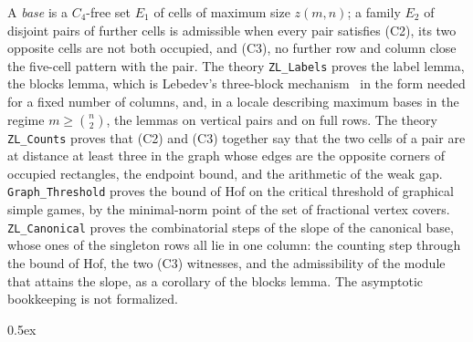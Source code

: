 \documentclass[10pt,a4paper]{article}
\begin{document}
A \emph{base} is a $C_4$-free set $E_1$ of cells of maximum size $z(m,n)$; a family $E_2$ of disjoint pairs of
further cells is admissible when every pair satisfies (C2), its two opposite cells are not both occupied, and (C3),
no further row and column close the five-cell pattern with the pair. The theory \texttt{ZL\_Labels} proves the label
lemma, the blocks lemma, which is Lebedev's three-block mechanism~\cite{Leb} in the form needed for a fixed number of
columns, and, in a locale describing maximum bases in the regime $m\ge\binom n2$, the lemmas on vertical pairs and on
full rows. The theory \texttt{ZL\_Counts} proves that (C2) and (C3) together say that the two cells of a pair are at
distance at least three in the graph whose edges are the opposite corners of occupied rectangles, the endpoint bound,
and the arithmetic of the weak gap.
\texttt{Graph\_Threshold} proves the bound of Hof on the critical threshold of graphical simple games, by the minimal-norm point of the set of fractional vertex covers.
\texttt{ZL\_Canonical} proves the combinatorial steps of the slope of the canonical base, whose ones of the singleton rows all lie in one column: the counting step through the bound of Hof, the two (C3) witnesses, and the admissibility of the module that attains the slope, as a corollary of the blocks lemma. The asymptotic bookkeeping is not formalized.

\parindent 0pt\parskip 0.5ex





\end{document}
